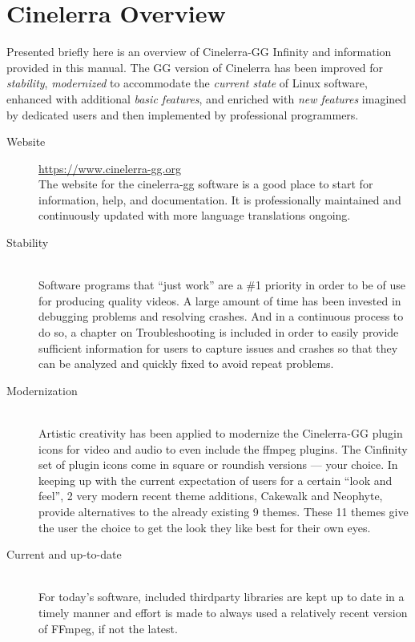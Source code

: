 \section*{Cinelerra Overview}%
\label{sec:cinelerra_overview}

Presented briefly here is an overview of Cinelerra-GG Infinity and information provided in this manual. 
The GG version of Cinelerra has been improved for \emph{stability}, \emph{modernized} to accommodate the
\emph{current state} of Linux software, enhanced with additional \emph{basic features}, and enriched with \emph{new features} imagined by dedicated users and then implemented by professional programmers.

\begin{description}
    \item[Website] \url{https://www.cinelerra-gg.org}\\
        The website for the cinelerra-gg software is a good place to start for information, help, and documentation. 
        It is professionally maintained and continuously updated with more language
        translations ongoing.
    \item[Stability] ~\\
        Software programs that “just work” are a \#1 priority in order to be of use for producing quality videos.
        A large amount of time has been invested in debugging problems and resolving crashes. 
        And in a continuous process to do so, a chapter on Troubleshooting is included in order to easily provide sufficient information for users to capture issues and crashes so that they can be analyzed and quickly fixed to avoid repeat problems.
    \item[Modernization] ~\\
        Artistic creativity has been applied to modernize the Cinelerra-GG plugin icons for video and audio to even include the ffmpeg plugins. 
        The Cinfinity set of plugin icons come in square or roundish versions --- your choice. 
        In keeping up with the current expectation of users for a certain “look and feel”, 2 very modern recent theme additions, Cakewalk and Neophyte, provide alternatives to the already existing 9 themes. 
        These 11 themes give the user the choice to get the look they like best for their own eyes.
    \item[Current and up-to-date] ~\\
        For today’s software, included thirdparty libraries are kept up to date in a timely manner and effort is made to always used a relatively recent version of FFmpeg, if not the latest. 

\end{description}
